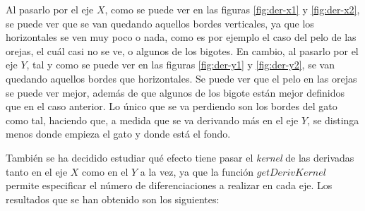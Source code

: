 \documentclass[11pt,a4paper]{article}
\begin{document}
Al pasarlo por el eje $X$, como se puede ver en las figuras \ref{fig:der-x1} y \ref{fig:der-x2}, se puede ver que se van
quedando aquellos bordes verticales, ya que los horizontales se ven muy poco o nada, como es por ejemplo el caso del pelo
de las orejas, el cuál casi no se ve, o algunos de los bigotes. En cambio, al pasarlo por el eje $Y$, tal y como se
puede ver en las figuras \ref{fig:der-y1} y \ref{fig:der-y2}, se van quedando aquellos bordes que horizontales.
Se puede ver que el pelo en las orejas se puede ver mejor, además de que algunos de los bigote están mejor definidos
que en el caso anterior. Lo único que se va perdiendo son los bordes del gato como tal, haciendo que, a medida que se
va derivando más en el eje $Y$, se distinga menos donde empieza el gato y donde está el fondo.

También se ha decidido estudiar qué efecto tiene pasar el \textit{kernel} de las derivadas tanto en el eje $X$ como en
el $Y$ a la vez, ya que la función $getDerivKernel$ permite especificar el número de diferenciaciones a realizar en cada
eje. Los resultados que se han obtenido son los siguientes:
\end{document}

